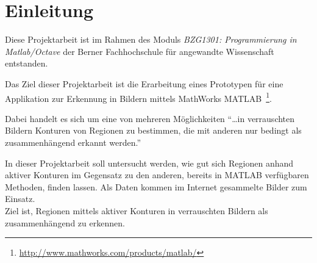 \chapter{Einleitung}
\label{chap:intro}

Diese Projektarbeit ist im Rahmen des Moduls \textit{BZG1301: Programmierung in Matlab/Octave} der Berner Fachhochschule für angewandte Wissenschaft entstanden.

Das Ziel dieser Projektarbeit ist die Erarbeitung eines Prototypen für eine Applikation zur Erkennung  in Bildern mittels MathWorks \gls{MATLAB}~\footnote{\url{http://www.mathworks.com/products/matlab/}}.

Dabei handelt es sich um eine von mehreren Möglichkeiten ``\ldots in verrauschten Bildern Konturen von Regionen zu bestimmen, die mit anderen  nur bedingt als zusammenhängend erkannt werden.''~\cite[S. 144]{hudritsch:script:cp}

In dieser Projektarbeit soll untersucht werden, wie gut sich Regionen anhand aktiver Konturen im Gegensatz zu den anderen, bereits in MATLAB verfügbaren Methoden, finden lassen. Als Daten kommen im Internet gesammelte Bilder zum Einsatz.\\
Ziel ist, Regionen mittels aktiver Konturen in verrauschten Bildern als zusammenhängend zu erkennen.

%  

